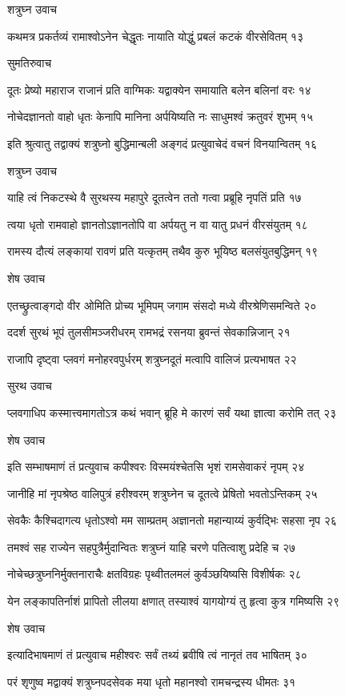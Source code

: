 शत्रुघ्न उवाच

कथमत्र प्रकर्तव्यं रामाश्वोऽनेन चेद्धृतः
नायाति योद्धुं प्रबलं कटकं वीरसेवितम् १३

सुमतिरुवाच

दूतः प्रेष्यो महाराज राजानं प्रति वाग्मिकः
यद्वाक्येन समायाति बलेन बलिनां वरः १४

नोचेदज्ञानतो वाहो धृतः केनापि मानिना
अर्पयिष्यति नः साधुमश्वं क्रतुवरं शुभम् १५

इति श्रुत्वातु तद्वाक्यं शत्रुघ्नो बुद्धिमान्बली
अङ्गदं प्रत्युवाचेदं वचनं विनयान्वितम् १६

शत्रुघ्न उवाच

याहि त्वं निकटस्थे वै सुरथस्य महापुरे
दूतत्वेन ततो गत्वा प्रब्रूहि नृपतिं प्रति १७

त्वया धृतो रामवाहो ज्ञानतोऽज्ञानतोपि वा
अर्पयतु न वा यातु प्रधनं वीरसंयुतम् १८

रामस्य दौत्यं लङ्कायां रावणं प्रति यत्कृतम्
तथैव कुरु भूयिष्ठ बलसंयुतबुद्धिमन् १९

शेष उवाच

एतच्छ्रुत्वाङ्गदो वीर ओमिति प्रोच्य भूमिपम्
जगाम संसदो मध्ये वीरश्रेणिसमन्विते २०

ददर्श सुरथं भूपं तुलसीमञ्जरीधरम्
रामभद्रं रसनया ब्रुवन्तं सेवकान्निजान् २१

राजापि दृष्ट्वा प्लवगं मनोहरवपुर्धरम्
शत्रुघ्नदूतं मत्वापि वालिजं प्रत्यभाषत २२

सुरथ उवाच

प्लवगाधिप कस्मात्त्वमागतोऽत्र कथं भवान्
ब्रूहि मे कारणं सर्वं यथा ज्ञात्वा करोमि तत् २३

शेष उवाच

इति सम्भाषमाणं तं प्रत्युवाच कपीश्वरः
विस्मयंश्चेतसि भृशं रामसेवाकरं नृपम् २४

जानीहि मां नृपश्रेष्ठ वालिपुत्रं हरीश्वरम्
शत्रुघ्नेन च दूतत्वे प्रेषितो भवतोऽन्तिकम् २५

सेवकैः कैश्चिदागत्य धृतोऽश्वो मम साम्प्रतम्
अज्ञानतो महान्याय्यं कुर्वद्भिः सहसा नृप २६

तमश्वं सह राज्येन सहपुत्रैर्मुदान्वितः
शत्रुघ्नं याहि चरणे पतित्वाशु प्रदेहि च २७

नोचेच्छत्रुघ्ननिर्मुक्तनाराचैः क्षतविग्रहः
पृथ्वीतलमलं कुर्वञ्छयिष्यसि विशीर्षकः २८

येन लङ्कापतिर्नाशं प्रापितो लीलया क्षणात्
तस्याश्वं यागयोग्यं तु हृत्वा कुत्र गमिष्यसि २९

शेष उवाच

इत्यादिभाषमाणं तं प्रत्युवाच महीश्वरः
सर्वं तथ्यं ब्रवीषि त्वं नानृतं तव भाषितम् ३०

परं शृणुष्व मद्वाक्यं शत्रुघ्नपदसेवक
मया धृतो महानश्वो रामचन्द्रस्य धीमतः ३१

